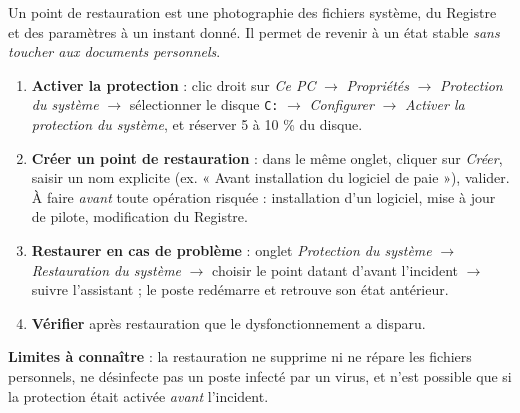 \documentclass[11pt]{article}
\newcommand{\cle}[1]{{\popxbold\color{popdark}#1}}
\begin{document}
\begin{methode}
Un \cle{point de restauration} est une photographie des fichiers système, du Registre et des paramètres à un instant donné. Il permet de revenir à un état stable \emph{sans toucher aux documents personnels}.
\begin{enumerate}
\item \textbf{Activer la protection} : clic droit sur \emph{Ce PC} $\to$ \emph{Propriétés} $\to$ \emph{Protection du système} $\to$ sélectionner le disque \texttt{C:} $\to$ \emph{Configurer} $\to$ \emph{Activer la protection du système}, et réserver 5 à 10 \% du disque.
\item \textbf{Créer un point de restauration} : dans le même onglet, cliquer sur \emph{Créer}, saisir un nom explicite (ex. « Avant installation du logiciel de paie »), valider. À faire \emph{avant} toute opération risquée : installation d'un logiciel, mise à jour de pilote, modification du Registre.
\item \textbf{Restaurer en cas de problème} : onglet \emph{Protection du système} $\to$ \emph{Restauration du système} $\to$ choisir le point datant d'avant l'incident $\to$ suivre l'assistant ; le poste redémarre et retrouve son état antérieur.
\item \textbf{Vérifier} après restauration que le dysfonctionnement a disparu.
\end{enumerate}
\textbf{Limites à connaître} : la restauration ne supprime ni ne répare les fichiers personnels, ne désinfecte pas un poste infecté par un virus, et n'est possible que si la protection était activée \emph{avant} l'incident.
\end{methode}
\end{document}
